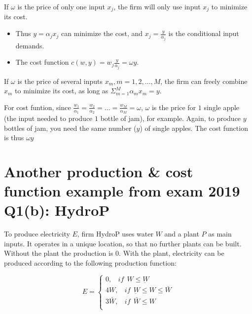 \documentclass{article}
\begin{document}
\vspace{2mm}

If $\omega$ is the price of only one input $x_j$, the firm will only use input $x_j$ to minimize its cost. 

\begin{itemize}
\item Thus $y = \alpha_j x_j$ can minimize the cost, and $x_j = \frac{y}{\alpha_j}$ is the conditional input demands.
\item The cost function $c(w,y) = w_j \frac{y}{\alpha_j} = \omega y$.
\end{itemize}


If $\omega$ is the price of several inputs $x_m, m = 1,2, \dots, M$, the firm can freely combine $x_m$ to minimize its cost, as long as  $\Sigma^M_{m=1} \alpha_m x_m = y$.

\vspace{2mm}

For cost funtion, since $\frac{w_1}{\alpha_1} = \frac{w_2}{\alpha_2}= \dots =\frac{w_M}{\alpha_M} = \omega$, $\omega$ is the price for $1$ single apple (the input needed to produce $1$ bottle of jam), for example. Again, to produce $y$ bottles of jam, you need the same number ($y$) of single apples. The cost function is thus $\omega y$

\section{Another production \& cost function example from exam 2019 Q1(b): HydroP}

To produce electricity $E$, firm HydroP uses water $W$ and a plant $P$ as
main inputs. It operates in a unique location, so that no further plants can be
built. Without the plant the production is $0$. With the plant, electricity can be
produced according to the following production function:


\begin{equation}
E=
    \begin{cases}
0, \ \ \ \ if \ \ W \le \underbar{W} \\
4W, \ \ \ \ if \ \   \underbar{W} \le   W \le \bar{W} \\
3\bar{W}, \ \ \ \ if \ \ \bar{W} \le W \\
    \end{cases}
    \label{eq:hydro}   
\end{equation}
\end{document}
